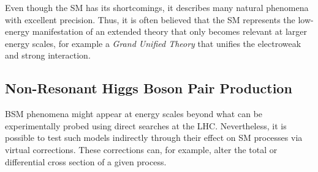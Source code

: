 \begin{description}





\end{description}
Even though the SM has its shortcomings, it describes many natural phenomena
with excellent precision. Thus, it is often believed that the SM represents the
low-energy manifestation of an extended theory that only becomes relevant at
larger energy scales, for example a \emph{Grand Unified Theory} that unifies the
electroweak and strong interaction.


\subsection{Non-Resonant Higgs Boson Pair Production}%
\label{sec:bsm_nonresonant_hh}

BSM phenomena might appear at energy scales beyond what can be experimentally
probed using direct searches at the LHC. Nevertheless, it is possible to test
such models indirectly through their effect on SM processes via virtual
corrections. These corrections can, for example, alter the total or differential
cross section of a given process.

